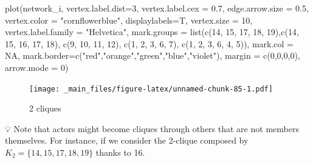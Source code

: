 \documentclass[
  notitlepage,
  onecolumn,
  openany]{book}
\newenvironment{Shaded}{\begin{snugshade}}{\end{snugshade}}
\newcommand{\AttributeTok}[1]{\textcolor[rgb]{0.77,0.63,0.00}{#1}}
\newcommand{\ConstantTok}[1]{\textcolor[rgb]{0.00,0.00,0.00}{#1}}
\newcommand{\DecValTok}[1]{\textcolor[rgb]{0.00,0.00,0.81}{#1}}
\newcommand{\FloatTok}[1]{\textcolor[rgb]{0.00,0.00,0.81}{#1}}
\newcommand{\FunctionTok}[1]{\textcolor[rgb]{0.00,0.00,0.00}{#1}}
\newcommand{\NormalTok}[1]{#1}
\newcommand{\StringTok}[1]{\textcolor[rgb]{0.31,0.60,0.02}{#1}}
\begin{document}
\begin{Shaded}
\begin{Highlighting}[]
\FunctionTok{plot}\NormalTok{(network\_i,}
     \AttributeTok{vertex.label.dist=}\DecValTok{3}\NormalTok{,}
     \AttributeTok{vertex.label.cex =} \FloatTok{0.7}\NormalTok{,}
     \AttributeTok{edge.arrow.size =} \FloatTok{0.5}\NormalTok{,}
     \AttributeTok{vertex.color =} \StringTok{"cornflowerblue"}\NormalTok{,}
     \AttributeTok{displaylabels=}\NormalTok{T,}
     \AttributeTok{vertex.size =} \DecValTok{10}\NormalTok{,}
     \AttributeTok{vertex.label.family =} \StringTok{"Helvetica"}\NormalTok{,}
     \AttributeTok{mark.groups =} \FunctionTok{list}\NormalTok{(}\FunctionTok{c}\NormalTok{(}\DecValTok{14}\NormalTok{, }\DecValTok{15}\NormalTok{, }\DecValTok{17}\NormalTok{, }\DecValTok{18}\NormalTok{, }\DecValTok{19}\NormalTok{),}\FunctionTok{c}\NormalTok{(}\DecValTok{14}\NormalTok{, }\DecValTok{15}\NormalTok{, }\DecValTok{16}\NormalTok{, }\DecValTok{17}\NormalTok{, }\DecValTok{18}\NormalTok{),}
                        \FunctionTok{c}\NormalTok{(}\DecValTok{9}\NormalTok{, }\DecValTok{10}\NormalTok{, }\DecValTok{11}\NormalTok{, }\DecValTok{12}\NormalTok{), }\FunctionTok{c}\NormalTok{(}\DecValTok{1}\NormalTok{, }\DecValTok{2}\NormalTok{, }\DecValTok{3}\NormalTok{, }\DecValTok{6}\NormalTok{, }\DecValTok{7}\NormalTok{), }\FunctionTok{c}\NormalTok{(}\DecValTok{1}\NormalTok{, }\DecValTok{2}\NormalTok{, }\DecValTok{3}\NormalTok{, }\DecValTok{6}\NormalTok{, }\DecValTok{4}\NormalTok{, }\DecValTok{5}\NormalTok{)),}
     \AttributeTok{mark.col =} \ConstantTok{NA}\NormalTok{,}
     \AttributeTok{mark.border=}\FunctionTok{c}\NormalTok{(}\StringTok{"red"}\NormalTok{,}\StringTok{"orange"}\NormalTok{,}\StringTok{"green"}\NormalTok{,}\StringTok{"blue"}\NormalTok{,}\StringTok{"violet"}\NormalTok{),}
     \AttributeTok{margin =} \FunctionTok{c}\NormalTok{(}\DecValTok{0}\NormalTok{,}\DecValTok{0}\NormalTok{,}\DecValTok{0}\NormalTok{,}\DecValTok{0}\NormalTok{),}
     \AttributeTok{arrow.mode =} \DecValTok{0}\NormalTok{)}
\end{Highlighting}
\end{Shaded}

\begin{figure}
\centering
\texttt{[image: \_main\_files/figure-latex/unnamed-chunk-85-1.pdf]}
\caption{\label{fig:unnamed-chunk-85}2 cliques}
\end{figure}

💡 Note that actors might become cliques through others that are not members themselves. For instance, if we consider the 2-clique composed by \(K_2 = \{14,15,17,18,19\}\) thanks to 16.
\end{document}
